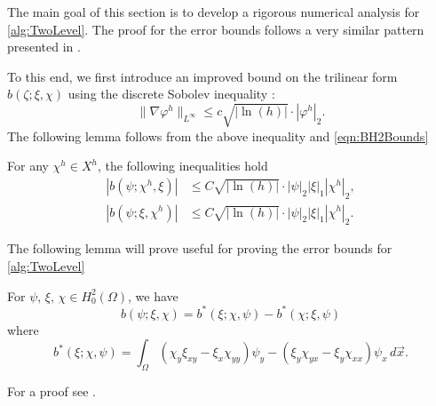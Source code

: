 The main goal of this section is to develop a rigorous numerical analysis for
\autoref{alg:TwoLevel}. The proof for the error bounds follows a very similar
pattern presented in \cite{Fairag98}.

To this end, we first introduce an improved bound on the trilinear form
$b(\zeta; \xi, \chi)$ using the discrete Sobolev inequality
\cite{Ciarlet,Fairag98}:
\begin{equation*}
  \|\nabla \varphi^h\|_{L^{\infty}} \le c \sqrt{|\ln(h)|}\cdot |\varphi^h|_2.
\end{equation*}
The following lemma follows from the above inequality and \eqref{eqn:BH2Bounds} %
\begin{lemma} \label{lma:bImproved}
  For any $\chi^h\in X^h$, the following inequalities hold
  \begin{align*}
    |b(\psi;\chi^h,\xi)| &\le C\sqrt{|\ln(h)|} \cdot |\psi|_2 |\xi|_1 |\chi^h|_2, \\
    |b(\psi;\xi,\chi^h)| &\le C\sqrt{|\ln(h)|} \cdot |\psi|_2 |\xi|_1 |\chi^h|_2.
  \end{align*}
\end{lemma}
The following lemma will prove useful for proving the error bounds for
\autoref{alg:TwoLevel}
\begin{lemma} \label{lma:trilinear}
  For $\psi,\,\xi,\,\chi\in H^2_0(\Omega)$, we have
  \begin{equation}
    b(\psi; \xi, \chi) = b^*(\xi; \chi, \psi) - b^*(\chi; \xi, \psi)
    \label{eqn:eqn:trilinear}
  \end{equation}
  where
  \begin{equation}
    b^*(\xi; \chi, \psi) = \int_{\Omega}\! (\chi_y\xi_{xy}-\xi_x\chi_{yy}) \psi_y -
    (\xi_y\chi_{yx}-\xi_y\chi_{xx}) \psi_x \,d\vec{x}.
    \label{eqn:trilinear}
  \end{equation}
\end{lemma}
For a proof see \cite{Fairag98}.

